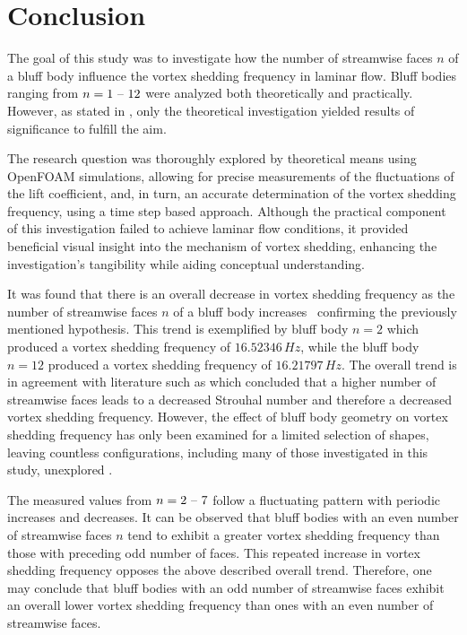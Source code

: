 \section{Conclusion}
\label{sec:conclusion}
The goal of this study was to investigate how the number of streamwise faces $n$ of a bluff body influence the vortex shedding frequency in laminar flow. Bluff bodies ranging from $n = 1 \text{ \textendash\ } 12$ were analyzed both theoretically and practically. However, as stated in , only the theoretical investigation yielded results of significance to fulfill the aim. 

The research question was thoroughly explored by theoretical means using OpenFOAM simulations, allowing for precise measurements of the fluctuations of the lift coefficient, and, in turn, an accurate determination of the vortex shedding frequency, using a time step based approach. Although the practical component of this investigation failed to achieve laminar flow conditions, it provided beneficial visual insight into the mechanism of vortex shedding, enhancing the investigation's tangibility while aiding conceptual understanding.

It was found that there is an overall decrease in vortex shedding frequency as the number of streamwise faces $n$ of a bluff body increases \textemdash\ confirming the previously mentioned hypothesis. This trend is exemplified by bluff body $n = 2$ which produced a vortex shedding frequency of $16.52346\, Hz$, while the bluff body $n = 12$ produced a vortex shedding frequency of $16.21797\, Hz$. The overall trend is in agreement with literature such as \textcite{goncalves1999strouhal} which concluded that a higher number of streamwise faces leads to a decreased Strouhal number and therefore a decreased vortex shedding frequency. However, the effect of bluff body geometry on vortex shedding frequency has only been examined for a limited selection of shapes, leaving countless configurations, including many of those investigated in this study, unexplored \parencite[22]{city7565}.

The measured values from $n = 2 \text{ \textendash\ } 7$ follow a fluctuating pattern with periodic increases and decreases. It can be observed that bluff bodies with an even number of streamwise faces $n$ tend to exhibit a greater vortex shedding frequency than those with preceding odd number of faces. This repeated increase in vortex shedding frequency opposes the above described overall trend. Therefore, one may conclude that bluff bodies with an odd number of streamwise faces exhibit an overall lower vortex shedding frequency than ones with an even number of streamwise faces.

